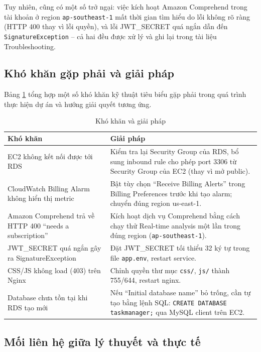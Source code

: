 \documentclass[13pt]{extarticle}
\begin{document}
Tuy nhiên, cũng có một số trở ngại: việc kích hoạt Amazon Comprehend trong
tài khoản ở region \texttt{ap-southeast-1} mất thời gian tìm hiểu do lỗi
không rõ ràng (HTTP 400 thay vì lỗi quyền), và lỗi JWT\_SECRET quá ngắn
dẫn đến \texttt{SignatureException} -- cả hai đều được xử lý và ghi lại
trong tài liệu Troubleshooting.

\subsection{Khó khăn gặp phải và giải pháp}

Bảng \ref{tab:issues} tổng hợp một số khó khăn kỹ thuật tiêu biểu gặp phải
trong quá trình thực hiện dự án và hướng giải quyết tương ứng.

\begin{longtable}{p{5.5cm}p{8cm}}
\caption{Khó khăn và giải pháp}
\label{tab:issues} \\
\toprule
\textbf{Khó khăn} & \textbf{Giải pháp} \\
\midrule
\endhead
EC2 không kết nối được tới RDS &
Kiểm tra lại Security Group của RDS, bổ sung inbound rule cho phép port 3306
từ Security Group của EC2 (thay vì mở public). \\
CloudWatch Billing Alarm không hiển thị metric &
Bật tùy chọn ``Receive Billing Alerts'' trong Billing Preferences trước khi
tạo alarm; chuyển đúng region us-east-1. \\
Amazon Comprehend trả về HTTP 400 ``needs a subscription'' &
Kích hoạt dịch vụ Comprehend bằng cách chạy thử Real-time analysis một lần
trong đúng region (\texttt{ap-southeast-1}). \\
JWT\_SECRET quá ngắn gây ra SignatureException &
Đặt JWT\_SECRET tối thiểu 32 ký tự trong file \texttt{app.env}, restart service. \\
CSS/JS không load (403) trên Nginx &
Chỉnh quyền thư mục \texttt{css/}, \texttt{js/} thành 755/644, restart nginx. \\
Database chưa tồn tại khi RDS tạo mới &
Nếu ``Initial database name'' bỏ trống, cần tự tạo bằng lệnh SQL:
\texttt{CREATE DATABASE taskmanager;} qua MySQL client trên EC2. \\
\bottomrule
\end{longtable}

\subsection{Mối liên hệ giữa lý thuyết và thực tế}
\end{document}
